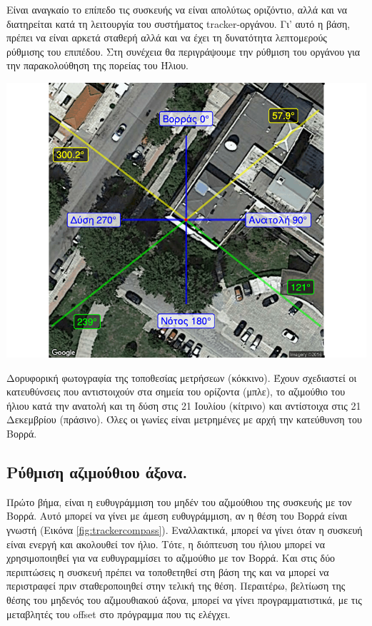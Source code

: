\documentclass[
  a4paper,
  twoside,
  titlepage,
  12pt]{article}
\numberwithin{equation}{section}
\numberwithin{figure}{section}
\numberwithin{table}{section}
\begin{document}
Είναι αναγκαίο το επίπεδο τις συσκευής να είναι απολύτως οριζόντιο, αλλά και να διατηρείται κατά τη λειτουργία του συστήματος tracker-οργάνου. Γι' αυτό η βάση, πρέπει να είναι αρκετά σταθερή αλλά και να έχει τη δυνατότητα λεπτομερούς ρύθμισης του επιπέδου. Στη συνέχεια θα περιγράψουμε την ρύθμιση του οργάνου για την παρακολούθηση της πορείας του Ήλιου.

\begin{img}

{\centering \includegraphics[width=1\linewidth]{figure/compass} 

}

\caption{Δορυφορική φωτογραφία της τοποθεσίας μετρήσεων (κόκκινο). Έχουν σχεδιαστεί οι κατευθύνσεις που αντιστοιχούν στα σημεία του ορίζοντα (μπλε), το αζιμούθιο του ήλιου κατά την ανατολή και τη δύση στις 21 Ιουλίου (κίτρινο) και αντίστοιχα στις 21 Δεκεμβρίου (πράσινο). Όλες οι γωνίες είναι μετρημένες με αρχή την κατεύθυνση του Βορρά.}\label{fig:trackercompass}
\end{img}

\hypertarget{ux3c1ux3cdux3b8ux3bcux3b9ux3c3ux3b7-ux3b1ux3b6ux3b9ux3bcux3bfux3cdux3b8ux3b9ux3bfux3c5-ux3acux3beux3bfux3bdux3b1.}{%
\subsection{Ρύθμιση αζιμούθιου άξονα.}\label{ux3c1ux3cdux3b8ux3bcux3b9ux3c3ux3b7-ux3b1ux3b6ux3b9ux3bcux3bfux3cdux3b8ux3b9ux3bfux3c5-ux3acux3beux3bfux3bdux3b1.}}

Πρώτο βήμα, είναι η ευθυγράμμιση του μηδέν του αζιμούθιου της συσκευής με τον Βορρά. Αυτό μπορεί να γίνει με άμεση ευθυγράμμιση, αν η θέση του Βορρά είναι γνωστή (Εικόνα \ref{fig:trackercompass}). Εναλλακτικά, μπορεί να γίνει όταν η συσκευή είναι ενεργή και ακολουθεί τον ήλιο. Τότε, η διόπτευση του ήλιου μπορεί να χρησιμοποιηθεί για να ευθυγραμμίσει το αζιμούθιο με τον Βορρά. Και στις δύο περιπτώσεις η συσκευή πρέπει να τοποθετηθεί στη βάση της και να μπορεί να περιστραφεί πριν σταθεροποιηθεί στην τελική της θέση. Περαιτέρω, βελτίωση της θέσης του μηδενός του αζιμουθιακού άξονα, μπορεί να γίνει προγραμματιστικά, με τις μεταβλητές του offset στο πρόγραμμα που τις ελέγχει.
\end{document}
